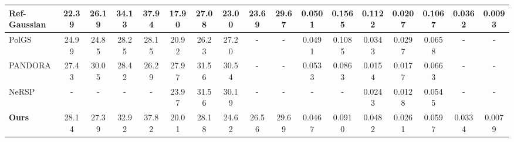 \begin{table}[t]
{\begin{tabular}{l||cc|cc|ccc|cc|cc|ccc|cc}
Ref-Gaussian & 22.39 & 26.19               & \cellcolor{colorSnd}34.13 & \cellcolor{colorTrd}37.94            & 17.90    & 27.08 & 23.00 & 23.69      & \cellcolor{colorSnd}29.67           & \cellcolor{colorTrd}0.0501 & 0.1565          & 0.1122   & \cellcolor{colorTrd}0.0207 & 0.1067 & \cellcolor{colorSnd}0.0362     & \cellcolor{colorSnd}0.0093           \\
\hline
PolGS      & \cellcolor{colorTrd}24.99 & 24.85               & 28.25 & 28.15            & 20.92    & 26.23 & \cellcolor{colorTrd}27.20  &  -          &     -            & \cellcolor{colorSnd}0.0491 & \cellcolor{colorTrd}0.1085          & \cellcolor{colorTrd}0.0343   & 0.0297 & \cellcolor{colorTrd}0.0658 &   -         &    -              \\
PANDORA\footnotemark[1]      & \cellcolor{colorSnd!60}27.43 &  \cellcolor{colorFst!60}30.05               & 28.42 & 26.29            &  \cellcolor{colorFst!60}27.97    &  \cellcolor{colorFst!60}31.56 &  \cellcolor{colorFst!60}30.54 &      -      &         -        & 0.0533 & \cellcolor{colorSnd!60}0.0863          &  \cellcolor{colorFst!60}0.0154   & \cellcolor{colorSnd!60}0.0177 & 0.0663 &    -        &     -             \\
NeRSP \footnotemark[1]       &   -    &    -                 &  -     &   -               & \cellcolor{colorSnd!60}23.97    &  \cellcolor{colorFst!60}31.56 & \cellcolor{colorSnd!60}30.19 &     -       &   -              &   -     &   -              & \cellcolor{colorSnd!60}0.0243   &  \cellcolor{colorFst!60}0.0128 &  \cellcolor{colorFst!60}0.0545 &    -        &    -              \\
\hline
\textbf{Ours}     & \cellcolor{colorFst}28.14 & \cellcolor{colorSnd}27.39               & \cellcolor{colorTrd}32.92 & 37.82            & 20.01    & \cellcolor{colorTrd}28.18 & 24.62 &  \cellcolor{colorFst}26.56      &  \cellcolor{colorFst}29.69           &  \cellcolor{colorFst}0.0467 &  \cellcolor{colorFst}0.0910          & 0.0482   & 0.0261 & \cellcolor{colorSnd}0.0597 &  \cellcolor{colorFst}0.0334     &  \cellcolor{colorFst}0.0079    \\
\hline\hline
\end{tabular}
}
\vspace{-6pt}
\end{table}
